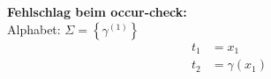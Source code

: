 \documentclass[aspectratio=1610,onlymath, ngerman]{beamer}
\renewcommand{\emph}[1]{\textbf{#1}}
\begin{document}
\begin{frame}
\begin{minipage}{\dimexpr0.5\linewidth-\fboxrule-\fboxsep}
\begin{center}
			\medskip
			\pause
			
			\emph{Fehlschlag beim occur-check:}  \\ 
			\textcolor{cdgray}{Alphabet: $\Sigma = \left\{\gamma^{(1)} \right\}$} \vspace{-\baselineskip}
			\begin{align*}
				t_1 &= x_1 \\
				t_2 &= \gamma(x_1)
			\end{align*}
		\end{center}
		\end{minipage}
	\end{frame}
\end{document}
